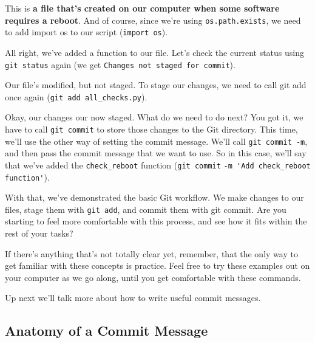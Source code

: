 	This is \textbf{a file that's created on our computer when some software requires a reboot}. And of course, since we're using \verb|os.path.exists|, we need to add import os to our script (\texttt{import os}).
	
	All right, we've added a function to our file. Let's check the current status using \texttt{git status} again (we get \texttt{Changes not staged for commit}).
	
	Our file's modified, but not staged. To stage our changes, we need to call git add once again (\verb|git add all_checks.py|).
	
	Okay, our changes our now staged. What do we need to do next? You got it, we have to call \texttt{git commit} to store those changes to the Git directory. This time, we'll use the other way of setting the commit message. We'll call \verb|git commit -m|, and then pass the commit message that we want to use. So in this case, we'll say that we've added the \verb|check_reboot| function (\texttt{git commit} \verb|-m 'Add check_reboot function'|).
	
	With that, we've demonstrated the basic Git workflow. We make changes to our files, stage them with \texttt{git add}, and commit them with git commit. Are you starting to feel more comfortable with this process, and see how it fits within the rest of your tasks?
	
	If there's anything that's not totally clear yet, remember, that the only way to get familiar with these concepts is practice. Feel free to try these examples out on your computer as we go along, until you get comfortable with these commands.
	
	Up next we'll talk more about how to write useful commit messages.
	
	\subsection{Anatomy of a Commit Message}
	
